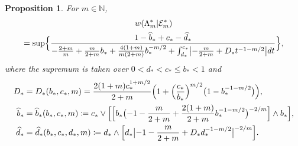 \documentclass[a4paper]{amsart} %
\newtheorem{proposition}[theorem]{Proposition} %
\theoremstyle{definition}
\theoremstyle{remark}
\numberwithin{equation}{section}
\newcommand*{\NNone}{\mathbb{N}}
\newcommand*{\weakconstrestricted}[2]{w(#1|#2)} %
\newcommand*{\fclassStar}[1]{\mathcal{E}_{#1}^*}
\newcommand*{\bStar}{b_*}
\newcommand*{\cStar}{c_*}
\newcommand*{\dStar}{d_*}
\newcommand*{\dOneStar}{D_*}%
\newcommand*{\bGainStar}{\widehat{b}_*}
\newcommand*{\dGainStar}{\widehat{d}_*}
\begin{document}
\begin{proposition}
	\label{prop:lower-bound-fixed-m-star}
	For $m\in\NNone$,
	\begin{multline*}
	\weakconstrestricted{\Lambda_m^*}{\fclassStar{m}} \\
	=
	\sup\Bigl\{
	\frac{1 - \bGainStar + \cStar - \dGainStar}{ -\frac{2+m}{m} + \frac{m}{2+m}\bStar + \frac{4(1+m)}{m(2+m)} \bStar^{-m/2} + \int^{\cStar}_{\dStar} \bigl|-\frac{m}{2+m} + \dOneStar t^{-1-m/2} \bigr| dt}
	\Bigr\},
	\end{multline*}
	where the supremum is taken over   $0 <\dStar <  \cStar \leq  \bStar < 1$ and  
	\begin{align*}
	\dOneStar &= \dOneStar(\bStar,\cStar, m) = \frac{2(1+m)\cStar^{1+m/2}}{2+m} \Bigl(1 + \Bigl(\frac{\cStar}{\bStar}\Bigr)^{m/2}\bigl(1 - \bStar^{-1-m/2}\bigr)\Bigr),\\
	\bGainStar &=\bGainStar(\bStar,\cStar,m)
	\coloneqq  \cStar\lor\Bigl[ \Bigl[\bStar \bigl( - 1 - \frac{m}{2+m}  + \frac{2(1+m)}{2+m} \bStar^{-1-m/2}\bigr) ^{-2/m}\Bigr] \land \bStar\Bigr],\\
	\dGainStar &=\dGainStar(\bStar,\cStar,\dStar,m)
	\coloneqq \dStar \land \Bigl[ \dStar \bigl|  -1 - \frac{m}{2+m}  + \dOneStar \dStar^{-1-m/2}\bigr|^{-2/m}\Bigr].	 
	\end{align*}
\end{proposition}
\end{document}

